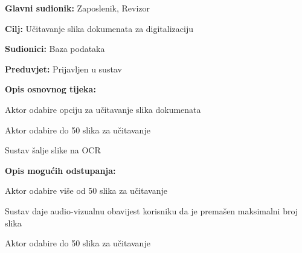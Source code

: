 					
					\noindent {}
					\begin{packed_item}
						
						\item \textbf{Glavni sudionik: } Zaposlenik, Revizor
						\item \textbf{Cilj:} Učitavanje slika dokumenata za digitalizaciju
						\item \textbf{Sudionici:} Baza podataka
						\item \textbf{Preduvjet:} Prijavljen u sustav
						\item \textbf{Opis osnovnog tijeka:}
						
						\item[] \begin{packed_enum}
							
							\item Aktor odabire opciju za učitavanje slika dokumenata
							\item Aktor odabire do 50 slika za učitavanje
							\item Sustav šalje slike na OCR
							
						\end{packed_enum}
						
						\item \textbf{Opis mogućih odstupanja:}
						
						\item[] \begin{packed_item}
							
							\item[2.a] Aktor odabire više od 50 slika za učitavanje
							\item[] \begin{packed_enum}
								
								\item Sustav daje audio-vizualnu obavijest korisniku da je premašen maksimalni broj slika
								\item Aktor odabire do 50 slika za učitavanje
								
							\end{packed_enum}
							
						\end{packed_item}
					\end{packed_item}
					
